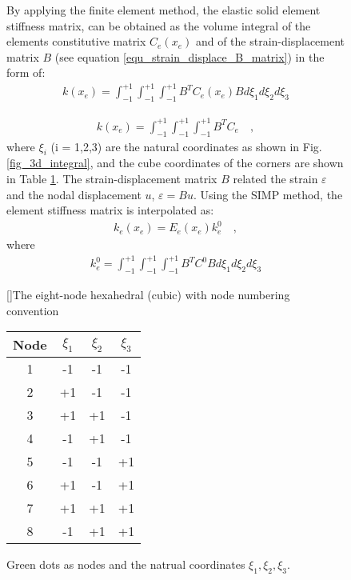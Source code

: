 \begin{figure}[!h]
\begin{minipage}{0.45\textwidth}
By applying the finite element method, the elastic solid element stiffness matrix, can be obtained as the volume integral of the elements constitutive matrix \textbf{$C_e(x_e)$} and of the strain-displacement matrix \textbf{$B$} (see equation \ref{equ_strain_displace_B_matrix}) in the form of:\\

\begin{align*}
k(x_e) = \int_{-1}^{+1} \int_{-1}^{+1}\int_{-1}^{+1} B^T C_e(x_e) B d  \xi_1 d \xi_2 d \xi_3 
\end{align*}

\begin{align*}
k(x_e) = \int_{-1}^{+1} \int_{-1}^{+1}\int_{-1}^{+1} B^TC_e \quad , 
\end{align*}
where $\xi_i$ (i = 1,2,3) are the natural coordinates as shown in Fig. \ref{fig_3d_integral}, and the cube coordinates of the corners are
shown in Table
\ref{tab_cube}. The strain-displacement
 matrix \textbf{$B$} related the strain \textbf{$\varepsilon$} and the nodal displacement \textbf{$u$}, \textbf{$\varepsilon = Bu$}. Using the SIMP method, the element stiffness matrix is interpolated as:\\

\begin{align}
k_e(x_e) = E_e(x_e)k_e^0 \quad , 
\end{align} 
where
\begin{align}
k_e^0 = \int_{-1}^{+1}\int_{-1}^{+1}\int_{-1}^{+1}B^TC^0Bd\xi_1 d \xi_2 d \xi_3
\label{equ_stiffnes_matrix_2}
\end{align}
\end{minipage}
\hfill
\begin{minipage}{0.4\textwidth}
 \centering
 \def\svgwidth{\textwidth}
 
 \caption{Green dots as nodes and the natrual coordinates $\xi_1,\xi_2,\xi_3$.} 
 \label{fig_3d_integral}   %
 \vspace{0.2cm}
[]{The eight-node hexahedral (cubic) with node numbering convention \cite{Andreassen.2011}}
\begin{center}
\begin{tabular}{|c|c|c|c|}
\hline 
Node & $\xi_1$ & $\xi_2$ & $\xi_3$ \\ 
\hline 
1 & -1 & -1 & -1 \\ 
\hline 
2 & +1 & -1 & -1 \\ 
\hline 
3 & +1 & +1 & -1 \\ 
\hline 
4 & -1 & +1 & -1 \\ 
\hline 
5 & -1 & -1 & +1 \\ 
\hline 
6 & +1 & -1 & +1 \\ 
\hline 
7 & +1 & +1 & +1 \\ 
\hline 
8 & -1 & +1 & +1 \\ 
\hline 
\end{tabular} 
\label{tab_cube}
\end{center}

\end{minipage}
\end{figure}

